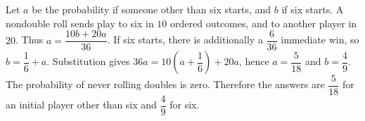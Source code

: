 Let $a$ be the probability if someone other than six starts, and $b$ if six starts. A nondouble roll sends play to six in $10$ ordered outcomes, and to another player in $20$. Thus $a=\dfrac{10b+20a}{36}$. If six starts, there is additionally a $\dfrac{6}{36}$ immediate win, so $b=\dfrac{1}{6}+a$. Substitution gives $36a=10(a+\dfrac{1}{6})+20a$, hence $a=\dfrac{5}{18}$ and $b=\dfrac{4}{9}$. The probability of never rolling doubles is zero. Therefore the answers are $\boxed{\dfrac{5}{18}}$ for an initial player other than six and $\boxed{\dfrac{4}{9}}$ for six.
